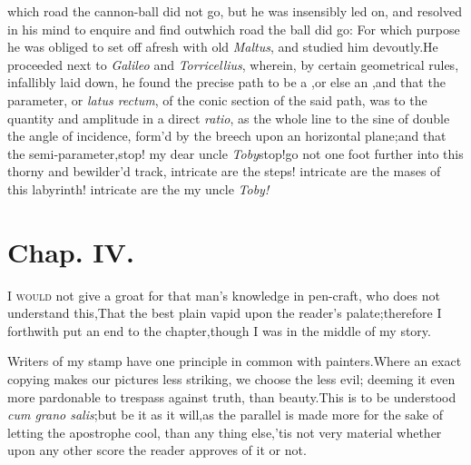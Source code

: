 \documentclass{article}
\begin{document}
\noindent
{}
which road the
cannon-ball did not go, but he was insensibly led on, and resolv\-ed
in his mind to enquire and find out\break which road the ball did go: For
which purpose he was obliged to set off afresh with old
\textit{Maltus}, and studied him devout\-ly.\tsk He proceeded next to
\textit{Galileo} and \textit{Torricellius}, wherein, by certain
geometrical rules, infallibly laid down, he found the precise path
to be a ,\tsk or else an
,\tsk and that the parameter, or \textit{latus
rectum}, of the conic section of the said path, was to the
quantity and amplitude in a direct \textit{ratio}, as the whole line
to the sine of double the angle of incidence, form’d by the breech
upon an horizontal plane;\tsk and that the
semi-\pb parameter,\tsh stop! my dear uncle
\textit{Toby}\tsh stop!\tsk go not one foot further\break 
into this thorny and bewilder’d track,\tsk\break
intricate are the steps!  intricate are the\break
mases of this labyrinth! intricate are the\break
{}
my uncle \textit{Toby!}

\newpage
\section{Chap. IV.}

\lettrine{I}{ would} not give a groat for that
man’s knowledge in pen-craft, who does not\break 
understand this,\tsk That the best plain
vapid upon the reader’s palate;\tsk there\-fore I forthwith put an end to the
chapter,\tsk though I was in the middle of my story.

\tsh Writers of my stamp have one principle in common
with painters.\tsk\break Where an exact copying makes our pictures less
striking, we choose the less evil; deeming it even more pardonable
to trespass against truth, than beauty.\tsk\break This is to be understood
\textit{cum grano salis};\pb but be it as it will,\tsk as the parallel
is made more for the sake of letting the apostrophe cool, than any
thing else,\tsk\break ’tis not very material whether upon any
other score the reader approves of it or not.
\end{document}
